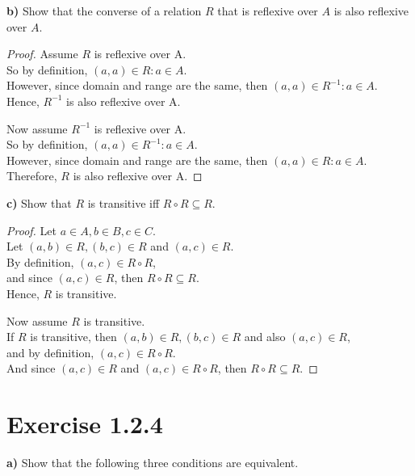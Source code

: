 \documentclass[titlepage, letterpaper, fleqn]{article}
\newcommand{\spacepls}{\vspace{5mm}}
\begin{document}
\spacepls

{\large \textbf{b)} Show that the converse of a relation \(R\) that is reflexive over \(A\) is also reflexive over \(A\).}

\begin{proof}
Assume \(R\) is reflexive over A.\\
So by definition, \((a,a) \in R : a \in A\).\\
However, since domain and range are the same, then \((a,a) \in R^{-1} : a \in A\).\\
Hence, \(R^{-1}\) is also reflexive over A.

\spacepls

Now assume \(R^{-1}\) is reflexive over A.\\
So by definition, \((a,a) \in R^{-1} : a \in A\).\\
However, since domain and range are the same, then \((a,a) \in R : a \in A\).\\
Therefore, \(R\) is also reflexive over A.
\end{proof}

\spacepls

{\large \textbf{c)} Show that \(R\) is transitive iff \(R \circ R \subseteq R\)}.

\begin{proof}
Let \(a \in A, b \in B, c \in C\).\\
Let \((a,b) \in R, (b,c) \in R\) and \((a,c) \in R\).\\
By definition, \((a,c) \in R \circ R\),\\
and since \((a,c) \in R\), then \(R \circ R \subseteq R\).\\
Hence, \(R\) is transitive.

\spacepls

Now assume \(R\) is transitive.\\
If \(R\) is transitive, then \((a,b) \in R, (b,c) \in R\) and also \((a,c) \in R\),\\
and by definition, \((a,c) \in R \circ R\).\\
And since \((a,c) \in R\) and \((a,c) \in R \circ R\), then \(R \circ R \subseteq R\).
\end{proof}

\pagebreak

\section{Exercise 1.2.4}

{\large \textbf{a)} Show that the following three conditions are equivalent.}
\end{document}
